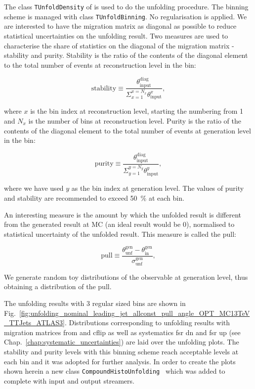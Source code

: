 The class \lstinline[language=sh]|TUnfoldDensity|\cite{Schmitt:2012kp} of \ROOT is used to do the unfolding procedure. The binning scheme is managed with class \lstinline[language=sh]|TUnfoldBinning|. No regularisation is applied. We are interested to have the migration matrix as diagonal as possible to reduce statistical uncertainties on the unfolding result. Two measures are used to characterise the share of statistics on the diagonal of the migration matrix - stability and purity. Stability is the ratio of the contents of the diagonal element to the total number of events at reconstruction level in the bin:

\begin{equation}
  \text{stability}\equiv\frac{\theta^{\text{diag}}_{\text{input}}}{\Sigma_{x=1}^{x=N_{x}}\theta^{x}_{\text{input}}},
\end{equation}

where $x$ is the bin index at reconstruction level, starting the numbering from 1 and $N_{x}$ is the number of bins at reconstruction level. Purity is the ratio of the contents of the diagonal element to the total number of events at generation level in the bin:

\begin{equation}
  \text{purity}\equiv\frac{\theta^{\text{diag}}_{\text{input}}}{\Sigma_{y=1}^{y=N_{y}}\theta^{y}_{\text{input}}},
\end{equation}

where we have used $y$ as the bin index at generation level. The values of purity and stability are recommended to exceed 50~\% at each bin.

An interesting measure is the amount by which the unfolded result is different from the generated result at MC (an ideal result would be 0), normalised to statistical uncertainty of the unfolded result. This measure is called the pull:

\begin{equation}
  \text{pull}\equiv\frac{\theta^{\text{gen}}_{\text{unf}}-\theta^{\text{gen}}_{\text{in}}}{\sigma^{\text{gen}}_{\text{unf}}},
\end{equation}

We generate random toy distributions of the observable at generation level, thus obtaining a distribution of the pull.

The unfolding results with 3 regular sized bins are shown in Fig.~\ref{fig:unfolding_nominal_leading_jet_allconst_pull_angle_OPT_MC13TeV_TTJets_ATLAS3}. Distributions corresponding to unfolding results with migration matrices from \ttbar \HERWIGpp and \ttbar cflip as well as systematics \ttbar fsr dn and \ttbar fsr up (see Chap.~\ref{chap:systematic_uncertainties}) are laid over the unfolding plots. The stability and purity levels with this binning scheme reach acceptable levels at each bin and it was adopted for further analysis. In order to create the plots shown herein a new class \lstinline[language=sh]|CompoundHistoUnfolding|~\cite{url:compoundhistounfolding} which was added to \ROOT complete with input and output streamers.

